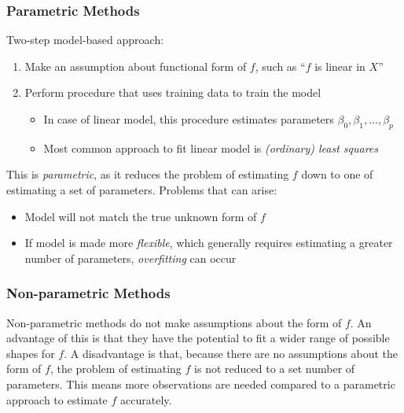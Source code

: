 \documentclass[]{book}
\providecommand{\tightlist}{%
  \setlength{\itemsep}{0pt}\setlength{\parskip}{0pt}}
\theoremstyle{definition}
\theoremstyle{definition}
\theoremstyle{definition}
\theoremstyle{remark}
\begin{document}
\subsubsection{Parametric Methods}\label{parametric-methods}

Two-step model-based approach:

\begin{enumerate}
\def\labelenumi{\arabic{enumi}.}
\tightlist
\item
  Make an assumption about functional form of \(f\), such as ``\(f\) is
  linear in \(X\)''
\item
  Perform procedure that uses training data to train the model

  \begin{itemize}
  \tightlist
  \item
    In case of linear model, this procedure estimates parameters
    \(β_0, β_1, ..., β_p\)
  \item
    Most common approach to fit linear model is \emph{(ordinary) least
    squares}
  \end{itemize}
\end{enumerate}

This is \emph{parametric}, as it reduces the problem of estimating \(f\)
down to one of estimating a set of parameters. Problems that can arise:

\begin{itemize}
\tightlist
\item
  Model will not match the true unknown form of \(f\)
\item
  If model is made more \emph{flexible}, which generally requires
  estimating a greater number of parameters, \emph{overfitting} can
  occur
\end{itemize}

\subsubsection{Non-parametric Methods}\label{non-parametric-methods}

Non-parametric methods do not make assumptions about the form of \(f\).
An advantage of this is that they have the potential to fit a wider
range of possible shapes for \(f\). A disadvantage is that, because
there are no assumptions about the form of \(f\), the problem of
estimating \(f\) is not reduced to a set number of parameters. This
means more observations are needed compared to a parametric approach to
estimate \(f\) accurately.
\end{document}
